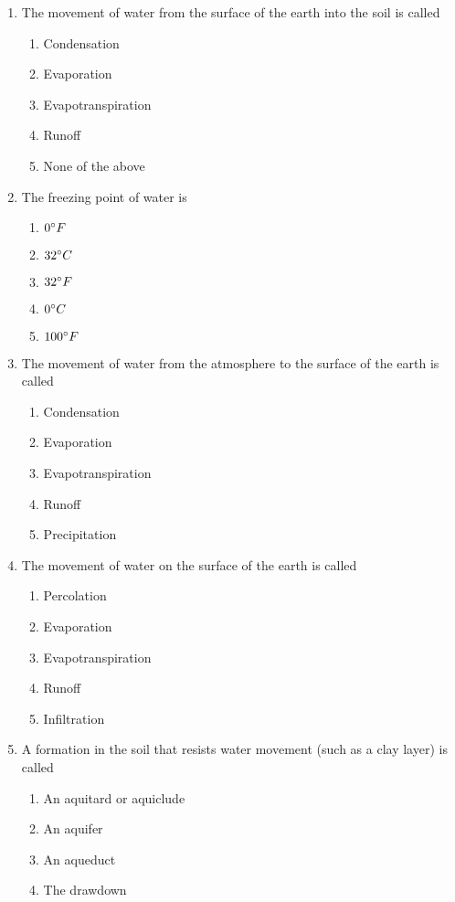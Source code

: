 \documentclass{article}
\begin{document}
\begin{enumerate}
\item The movement of water from the surface of the earth into the soil is called
\begin{enumerate}
\item Condensation
\item Evaporation
\item Evapotranspiration
\item Runoff
\item None of the above
\end{enumerate}

\item The freezing point of water is
\begin{enumerate}
\item $0\degree{F}$
\item $32\degree{C}$
\item $32\degree{F}$
\item $0\degree{C}$
\item $100\degree{F}$
\end{enumerate}

\item The movement of water from the atmosphere to the surface of the earth is called
\begin{enumerate}
\item Condensation
\item Evaporation
\item Evapotranspiration
\item Runoff
\item Precipitation
\end{enumerate}

\item The movement of water on the surface of the earth is called
\begin{enumerate}
\item Percolation
\item Evaporation
\item Evapotranspiration
\item Runoff
\item Infiltration
\end{enumerate}

\item A formation in the soil that resists water movement (such as a clay layer) is called
\begin{enumerate}
\item An aquitard or aquiclude
\item An aquifer
\item An aqueduct
\item The drawdown
\end{enumerate}


\end{enumerate}
\end{document}
